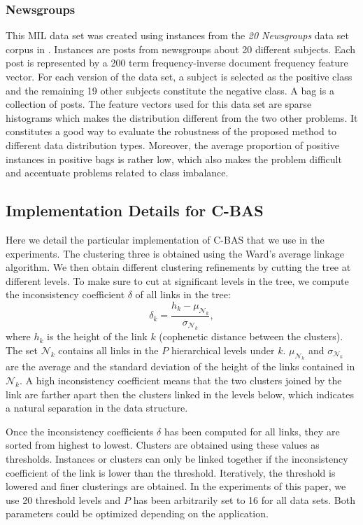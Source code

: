 \documentclass{article}
\begin{document}
\subsubsection{Newsgroups}
This MIL data set was created using instances from the \textit{20 Newsgroups} data set corpus in \cite{Settles2008}. Instances are posts from newsgroups about 20 different subjects. Each post is represented by a 200 term frequency-inverse document frequency feature vector. For each version of the data set, a subject is selected as the positive class and the remaining 19 other subjects constitute the negative class. A bag is a collection of posts. The feature vectors used for this data set are sparse histograms which makes the distribution different from the two other problems. It constitutes a good way to evaluate the robustness of the proposed method to different data distribution types. Moreover, the average proportion of positive instances in positive bags is rather low, which also makes the problem difficult and accentuate problems related to class imbalance. 





\subsection{Implementation Details for C-BAS}
\label{Section:DetailsCBASS}
Here we detail the particular implementation of C-BAS that we use in the experiments. The clustering three is obtained using the Ward's average linkage algorithm. We then obtain different clustering refinements by cutting the tree at different levels. To make sure to cut at significant levels in the tree, we compute the inconsistency coefficient $\delta$ of all links in the tree: 
\begin{equation}
\delta_k = \frac{h_k-\mu_{\mathcal{N}_k}}{\sigma_{\mathcal{N}_k}},
\end{equation}
where $h_k$ is the height of the link $k$ (cophenetic distance between the clusters). The set $\mathcal{N}_k$ contains all links in the $P$ hierarchical levels under $k$. $\mu_{\mathcal{N}_k}$ and $\sigma_{\mathcal{N}_k}$ are the average and the standard deviation of the height of the links contained in $\mathcal{N}_k$. A high inconsistency coefficient means that the two clusters joined by the link are farther apart then the clusters linked in the levels below, which indicates a natural separation in the data structure. 

Once the inconsistency coefficients $\delta$ has been computed for all links, they are sorted from highest to lowest. Clusters are obtained using these values as thresholds. Instances or clusters can only be linked together if the inconsistency coefficient of the link is lower than the threshold. Iteratively, the threshold is lowered and finer clusterings are obtained. In the experiments of this paper, we use 20 threshold levels and $P$ has been arbitrarily set to 16 for all data sets. Both parameters could be optimized depending on the application. 
\end{document}
